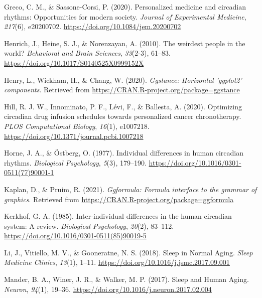 \documentclass[
  english,
  jou,floatsintext]{apa6}
\newlength{\cslhangindent}
\newenvironment{CSLReferences}[2] %
 {%
  \setlength{\parindent}{0pt}
  \ifodd #1 \everypar{\setlength{\hangindent}{\cslhangindent}}\ignorespaces\fi
  \ifnum #2 > 0
  \setlength{\parskip}{#2\baselineskip}
  \fi
 }%
 {}
\begin{document}
\begin{CSLReferences}{1}{0}
\leavevmode{}%
Greco, C. M., \& Sassone-Corsi, P. (2020). Personalized medicine and circadian rhythms: {Opportunities} for modern society. \emph{Journal of Experimental Medicine}, \emph{217}(6), e20200702. \url{https://doi.org/10.1084/jem.20200702}

\leavevmode{}%
Henrich, J., Heine, S. J., \& Norenzayan, A. (2010). The weirdest people in the world? \emph{Behavioral and Brain Sciences}, \emph{33}(2-3), 61--83. \url{https://doi.org/10.1017/S0140525X0999152X}

\leavevmode{}%
Henry, L., Wickham, H., \& Chang, W. (2020). \emph{Ggstance: Horizontal 'ggplot2' components}. Retrieved from \url{https://CRAN.R-project.org/package=ggstance}

\leavevmode{}%
Hill, R. J. W., Innominato, P. F., Lévi, F., \& Ballesta, A. (2020). Optimizing circadian drug infusion schedules towards personalized cancer chronotherapy. \emph{PLOS Computational Biology}, \emph{16}(1), e1007218. \url{https://doi.org/10.1371/journal.pcbi.1007218}

\leavevmode{}%
Horne, J. A., \& Östberg, O. (1977). Individual differences in human circadian rhythms. \emph{Biological Psychology}, \emph{5}(3), 179--190. \url{https://doi.org/10.1016/0301-0511(77)90001-1}

\leavevmode{}%
Kaplan, D., \& Pruim, R. (2021). \emph{Ggformula: Formula interface to the grammar of graphics}. Retrieved from \url{https://CRAN.R-project.org/package=ggformula}

\leavevmode{}%
Kerkhof, G. A. (1985). Inter-individual differences in the human circadian system: {A} review. \emph{Biological Psychology}, \emph{20}(2), 83--112. \url{https://doi.org/10.1016/0301-0511(85)90019-5}

\leavevmode{}%
Li, J., Vitiello, M. V., \& Gooneratne, N. S. (2018). Sleep in {Normal} {Aging}. \emph{Sleep Medicine Clinics}, \emph{13}(1), 1--11. \url{https://doi.org/10.1016/j.jsmc.2017.09.001}

\leavevmode{}%
Mander, B. A., Winer, J. R., \& Walker, M. P. (2017). Sleep and {Human} {Aging}. \emph{Neuron}, \emph{94}(1), 19--36. \url{https://doi.org/10.1016/j.neuron.2017.02.004}


\end{CSLReferences}
\end{document}

